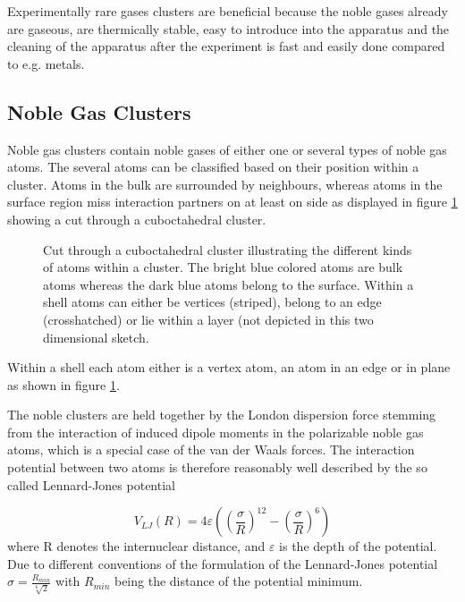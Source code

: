 Experimentally rare gases clusters are beneficial because the noble gases
already are gaseous, are
thermically stable, easy to introduce into the apparatus
and the cleaning of the
apparatus after the experiment is fast and easily done compared to
e.g. metals.


\subsection{Noble Gas Clusters}
Noble gas clusters contain noble gases of either one or several types of
noble gas atoms. The several atoms can be classified based on
their position within a cluster. Atoms in the bulk are surrounded by
neighbours, whereas atoms in the surface region miss interaction
partners on at least on side as displayed in figure \ref{figure:cluster_cut} showing
a cut through a cuboctahedral cluster.

\begin{figure}[h]
 \centering
 
 \caption{Cut through a cuboctahedral cluster illustrating the different
          kinds of atoms within a cluster. The bright blue colored atoms
          are bulk atoms whereas the dark blue atoms belong to the surface.
          Within a shell atoms can either be vertices (striped), belong to
          an edge (crosshatched) or lie within a layer (not depicted in this
          two dimensional sketch.}
 \label{figure:cluster_cut}
\end{figure}

Within a shell each atom either is a vertex atom, an atom in an edge
or in plane as shown in figure \ref{figure:cluster_cut}.

The noble clusters are held together by the London dispersion force
stemming from the interaction of induced dipole moments in the polarizable
noble gas atoms, which is a special case of the van der Waals forces.
The interaction potential between two atoms is therefore reasonably
well described by the so called
Lennard-Jones potential

\begin{equation}
  V_{LJ}(R) = 4 \varepsilon \left( \left(\frac{\sigma}{R}\right) ^{12}
              - \left(\frac{\sigma}{R}\right) ^{6} \right)
\end{equation}
where R denotes the internuclear distance, 
and $\varepsilon$ is the depth of the
potential. Due to different conventions of the formulation
of the Lennard-Jones potential $\sigma=\frac{R_{min}}{\sqrt[6]{2}}$
with $R_{min}$ being the distance of the potential minimum.

